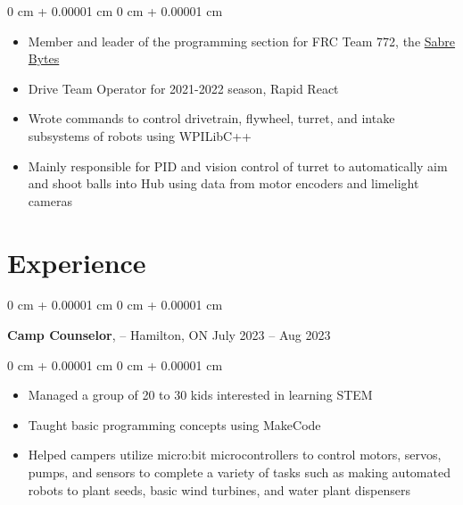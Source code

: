 \documentclass[10pt, letterpaper]{article}
\newenvironment{highlights}{
    \begin{itemize}[
        topsep=0.10 cm,
        parsep=0.10 cm,
        partopsep=0pt,
        itemsep=0pt,
        leftmargin=0 cm + 10pt
    ]
}{
    \end{itemize}
} %
\newenvironment{onecolentry}{
    \begin{adjustwidth}{
        0 cm + 0.00001 cm
    }{
        0 cm + 0.00001 cm
    }
}{
    \end{adjustwidth}
} %
\newenvironment{twocolentry}[2][]{
    \onecolentry
    \def\secondColumn{#2}
    \setcolumnwidth{\fill, 4.5 cm}
    \begin{paracol}{2}
}{
    \switchcolumn \raggedleft \secondColumn
    \end{paracol}
    \endonecolentry
} %
\newcommand{\customref}[3][primaryColor]{\href{#2}{\color{#1}{\underline{#3}}}}
\begin{document}
        \vspace{0.10 cm}
        \begin{onecolentry}
            \begin{highlights}
                \item Member and leader of the programming section for FRC Team 772, the \href{https://www.sabrerobotics.com/}{Sabre Bytes}
                \item Drive Team Operator for 2021-2022 season, Rapid React
                \item Wrote commands to control drivetrain, flywheel, turret, and intake subsystems of robots using WPILibC++
                \item Mainly responsible for PID and vision control of turret to automatically aim and shoot balls into Hub using data from motor encoders and limelight cameras
            \end{highlights}
        \end{onecolentry}



    
    \section{Experience}



        
        \begin{twocolentry}{
            July 2023 – Aug 2023
        }
            \textbf{Camp Counselor}, \textbf{\customref[blue]{https://stemcamp.ca/}{STEM Camp}} -- Hamilton, ON\end{twocolentry}

        \vspace{0.10 cm}
        \begin{onecolentry}
            \begin{highlights}
                \item Managed a group of 20 to 30 kids interested in learning STEM
                \item Taught basic programming concepts using MakeCode
                \item Helped campers utilize micro:bit microcontrollers to control motors, servos, pumps, and sensors to complete a variety of tasks such as making automated robots to plant seeds, basic wind turbines, and water plant dispensers
            \end{highlights}
        \end{onecolentry}
\end{document}
